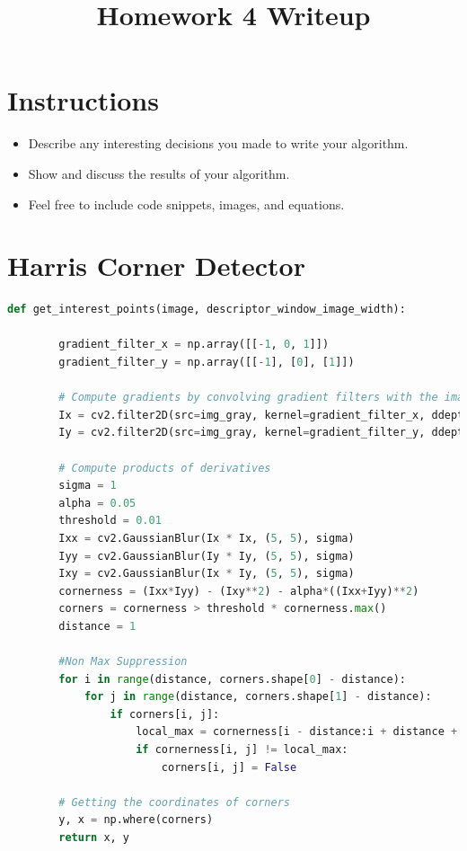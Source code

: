 \pagestyle{fancy}
\fancyhf{}
\rfoot{\thepage}

\date{}

\title{\vspace{-1cm}Homework 4 Writeup}



\maketitle
\vspace{-3cm}
\thispagestyle{fancy}

\section*{Instructions}
\begin{itemize}
  \item Describe any interesting decisions you made to write your algorithm.
  \item Show and discuss the results of your algorithm.
  \item Feel free to include code snippets, images, and equations.

\end{itemize}

\section*{Harris Corner Detector}
\begin{lstlisting}[language=python]
    def get_interest_points(image, descriptor_window_image_width):
        
        gradient_filter_x = np.array([[-1, 0, 1]])
        gradient_filter_y = np.array([[-1], [0], [1]])

        # Compute gradients by convolving gradient filters with the image
        Ix = cv2.filter2D(src=img_gray, kernel=gradient_filter_x, ddepth=-1)
        Iy = cv2.filter2D(src=img_gray, kernel=gradient_filter_y, ddepth=-1)

        # Compute products of derivatives
        sigma = 1
        alpha = 0.05
        threshold = 0.01
        Ixx = cv2.GaussianBlur(Ix * Ix, (5, 5), sigma)
        Iyy = cv2.GaussianBlur(Iy * Iy, (5, 5), sigma)
        Ixy = cv2.GaussianBlur(Ix * Iy, (5, 5), sigma)
        cornerness = (Ixx*Iyy) - (Ixy**2) - alpha*((Ixx+Iyy)**2)
        corners = cornerness > threshold * cornerness.max()
        distance = 1

        #Non Max Suppression
        for i in range(distance, corners.shape[0] - distance):
            for j in range(distance, corners.shape[1] - distance):
                if corners[i, j]:
                    local_max = cornerness[i - distance:i + distance + 1, j - distance:j + distance + 1].max()
                    if cornerness[i, j] != local_max:
                        corners[i, j] = False

        # Getting the coordinates of corners
        y, x = np.where(corners)
        return x, y
\end{lstlisting}

